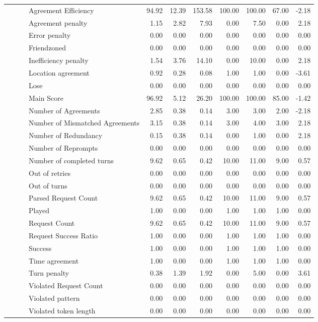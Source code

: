 \begin{tabular}{llllrrrrrrr}
 &  &  & Agreement Efficiency & 94.92 & 12.39 & 153.58 & 100.00 & 100.00 & 67.00 & -2.18 \\
 &  &  & Agreement penalty & 1.15 & 2.82 & 7.93 & 0.00 & 7.50 & 0.00 & 2.18 \\
 &  &  & Error penalty & 0.00 & 0.00 & 0.00 & 0.00 & 0.00 & 0.00 & 0.00 \\
 &  &  & Friendzoned & 0.00 & 0.00 & 0.00 & 0.00 & 0.00 & 0.00 & 0.00 \\
 &  &  & Inefficiency penalty & 1.54 & 3.76 & 14.10 & 0.00 & 10.00 & 0.00 & 2.18 \\
 &  &  & Location agreement & 0.92 & 0.28 & 0.08 & 1.00 & 1.00 & 0.00 & -3.61 \\
 &  &  & Lose & 0.00 & 0.00 & 0.00 & 0.00 & 0.00 & 0.00 & 0.00 \\
 &  &  & Main Score & 96.92 & 5.12 & 26.20 & 100.00 & 100.00 & 85.00 & -1.42 \\
 &  &  & Number of Agreements & 2.85 & 0.38 & 0.14 & 3.00 & 3.00 & 2.00 & -2.18 \\
 &  &  & Number of Mismatched Agreements & 3.15 & 0.38 & 0.14 & 3.00 & 4.00 & 3.00 & 2.18 \\
 &  &  & Number of Redundancy & 0.15 & 0.38 & 0.14 & 0.00 & 1.00 & 0.00 & 2.18 \\
 &  &  & Number of Reprompts & 0.00 & 0.00 & 0.00 & 0.00 & 0.00 & 0.00 & 0.00 \\
 &  &  & Number of completed turns & 9.62 & 0.65 & 0.42 & 10.00 & 11.00 & 9.00 & 0.57 \\
 &  &  & Out of retries & 0.00 & 0.00 & 0.00 & 0.00 & 0.00 & 0.00 & 0.00 \\
 &  &  & Out of turns & 0.00 & 0.00 & 0.00 & 0.00 & 0.00 & 0.00 & 0.00 \\
 &  &  & Parsed Request Count & 9.62 & 0.65 & 0.42 & 10.00 & 11.00 & 9.00 & 0.57 \\
 &  &  & Played & 1.00 & 0.00 & 0.00 & 1.00 & 1.00 & 1.00 & 0.00 \\
 &  &  & Request Count & 9.62 & 0.65 & 0.42 & 10.00 & 11.00 & 9.00 & 0.57 \\
 &  &  & Request Success Ratio & 1.00 & 0.00 & 0.00 & 1.00 & 1.00 & 1.00 & 0.00 \\
 &  &  & Success & 1.00 & 0.00 & 0.00 & 1.00 & 1.00 & 1.00 & 0.00 \\
 &  &  & Time agreement & 1.00 & 0.00 & 0.00 & 1.00 & 1.00 & 1.00 & 0.00 \\
 &  &  & Turn penalty & 0.38 & 1.39 & 1.92 & 0.00 & 5.00 & 0.00 & 3.61 \\
 &  &  & Violated Request Count & 0.00 & 0.00 & 0.00 & 0.00 & 0.00 & 0.00 & 0.00 \\
 &  &  & Violated pattern & 0.00 & 0.00 & 0.00 & 0.00 & 0.00 & 0.00 & 0.00 \\
 &  &  & Violated token length & 0.00 & 0.00 & 0.00 & 0.00 & 0.00 & 0.00 & 0.00 \\
\cline{1-11} \cline{2-11} \cline{3-11}
\bottomrule
\end{tabular}
